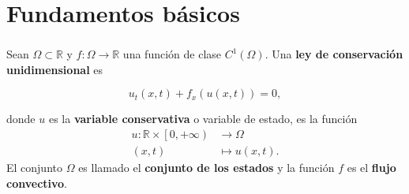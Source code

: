 \section{Fundamentos básicos}

\begin{frame}
    \frametitle{\secname}

    \begin{definition}
        Sean
        \begin{math}
            \Omega\subset
            \mathbb{R}
        \end{math}
        y
        \begin{math}
            f\colon\Omega\to
            \mathbb{R}
        \end{math}
        una función de clase
        \begin{math}
            C^{1}
            \left(\Omega\right)
        \end{math}.
        Una \textbf{ley de conservación unidimensional} es

        \begin{equation}\label{eq:differentialconservationlaw}
            u_{t}
            \left(x,t\right)+
            f_{x}
            \left(
            u\left(x,t\right)
            \right)=
            0,
        \end{equation}

        donde $u$ es la \textbf{variable conservativa} o variable de
        estado, es la función
        \begin{align*}
            u\colon\mathbb{R}\times
            \left[0,+\infty\right) &
            \longrightarrow
            \Omega                   \\
            \left(x,t\right)       &
            \longmapsto
            u\left(x,t\right).
        \end{align*}
        El conjunto $\Omega$ es llamado el \textbf{conjunto de los estados}
        y la función $f$ es el \textbf{flujo convectivo}.
    \end{definition}
\end{frame}


